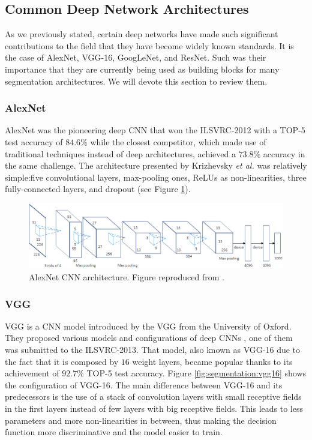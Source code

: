 \subsection{Common Deep Network Architectures}

As we previously stated, certain deep networks have made such significant contributions to the field that they have become widely known standards. It is the case of AlexNet, \acs{VGG}-16, GoogLeNet, and ResNet. Such was their importance that they are currently being used as building blocks for many segmentation architectures. We will devote this section to review them.

\subsubsection{AlexNet}

AlexNet was the pioneering deep \acs{CNN} that won the \acs{ILSVRC}-2012 with a TOP-5 test accuracy of $84.6\%$ while the closest competitor, which made use of traditional techniques instead of deep architectures, achieved a $73.8\%$ accuracy in the same challenge. The architecture presented by Krizhevsky \emph{et al.} \cite{Krizhevsky2012} was relatively simple:five convolutional layers, max-pooling ones, \acp{ReLU} as non-linearities, three fully-connected layers, and dropout (see Figure \ref{fig:semseg:alexnet}).

\begin{figure}[!hbt]
	\centering
	\includegraphics[width=0.9\linewidth]{Figures/Segmentation/alexnet_rework.eps}
	\caption{AlexNet \acl{CNN} architecture. Figure reproduced from \cite{Krizhevsky2012}.}
	\label{fig:semseg:alexnet}
\end{figure}

\subsubsection{\acs{VGG}}

\acs{VGG} is a \ac{CNN} model introduced by the \acf{VGG} from the University of Oxford. They proposed various models and configurations of deep \acp{CNN} \cite{Simonyan2014}, one of them was submitted to the \ac{ILSVRC}-2013. That model, also known as \acs{VGG}-16 due to the fact that it is composed by $16$ weight layers, became popular thanks to its achievement of $92.7\%$ TOP-5 test accuracy. Figure \ref{fig:segmentation:vgg16} shows the configuration of \acs{VGG}-16. The main difference between \acs{VGG}-16 and its predecessors is the use of a stack of convolution layers with small receptive fields in the first layers instead of few layers with big receptive fields. This leads to less parameters and more non-linearities in between, thus making the decision function more discriminative and the model easier to train.

